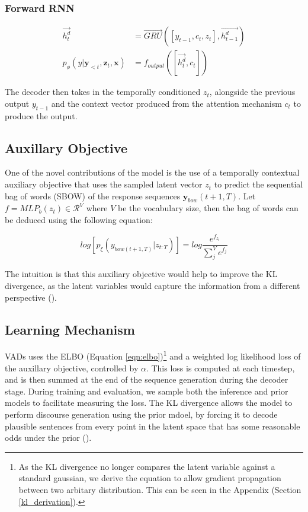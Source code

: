 \documentclass[12pt,twoside]{report}
\begin{document}
\subsubsection{Forward RNN}


\begin{equation}
	\begin{split}
		\overrightarrow{h^d_t} &= \overrightarrow{GRU}([y_{t-1},c_t,z_t], \overrightarrow{h^d_{t-1}}) \\
		p_\phi(y|\boldsymbol{y}_{<t},\boldsymbol{z}_t, \boldsymbol{x}) &= f_{output}([\overrightarrow{h^d_t}, c_t])
	\end{split}
\end{equation}

The decoder then takes in the temporally conditioned $z_t$, alongside the previous output $y_{t-1}$ and the context vector produced from the attention mechanism $c_t$ to produce the output. 

\subsection{Auxillary Objective}
\label{aux_obj}
One of the novel contributions of the model is the use of a temporally contextual auxiliary objective that uses the sampled latent vector $z_t$ to predict the sequential bag of words (SBOW) of the response sequences $\boldsymbol{y}_{bow}(t+1,T)$. Let $f=MLP_b(z_t) \in \mathcal{R}^V$ where $V$ be the vocabulary size, then the bag of words can be deduced using the following equation:

\begin{equation}
	log [p_\xi(y_{bow(t+1,T)}|z_{t:T}) ] = log  \frac{e^{f_{z_{t}}}}{\sum^V_j e^{f_{j}}}
\end{equation}

The intuition is that this auxiliary objective would help to improve the KL divergence, as the latent variables would capture the information from a different perspective (\cite{du_variational_2018}).

\subsection{Learning Mechanism}


VADs uses the ELBO (Equation \ref{eqn:elbo})\footnote{As the KL divergence no longer compares the latent variable against a standard gaussian, we derive the equation to allow gradient propagation between two arbitary distribution. This can be seen in the Appendix (Section \ref{kl_derivation}).} and a weighted log likelihood loss of the auxillary objective, controlled by $\alpha$. This loss is computed at each timestep, and is then summed at the end of the sequence generation during the decoder stage. During training and evaluation, we sample both the inference and prior models to facilitate measuring the loss. The KL divergence allows the model to perform discourse generation using the prior mdoel, by forcing it to decode plausible sentences from every point in the latent space that has some reasonable odds under the prior (\cite{bowman_generating_2015}).
\end{document}
